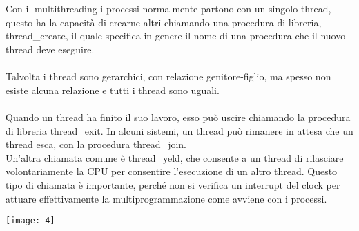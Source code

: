 \documentclass{article}
\begin{document}
\\\\
Con il multithreading i processi normalmente partono con un singolo thread, questo ha la capacità di crearne altri chiamando una procedura di libreria, thread\_create, il quale specifica in genere il nome di una procedura che il nuovo thread deve eseguire.
\\
\\
Talvolta i thread sono gerarchici, con relazione genitore-figlio, ma spesso non esiste alcuna relazione e tutti i thread sono uguali.
\\\\
Quando un thread ha finito il suo lavoro, esso può uscire chiamando la procedura di libreria thread\_exit. In alcuni sistemi, un thread può rimanere in attesa che un thread esca, con la procedura thread\_join.
\\Un’altra chiamata comune è thread\_yeld, che consente a un thread di rilasciare volontariamente la CPU per consentire l’esecuzione di un altro thread. Questo tipo di chiamata è importante, perché non si verifica un interrupt del clock per attuare effettivamente la multiprogrammazione come avviene con i processi.
\begin{center}\texttt{[image: 4]}\end{center}
\end{document}
